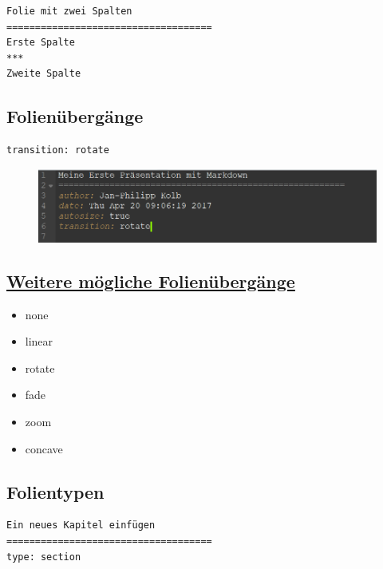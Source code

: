 \documentclass[]{article}
\providecommand{\tightlist}{%
  \setlength{\itemsep}{0pt}\setlength{\parskip}{0pt}}
\begin{document}
\begin{verbatim}
Folie mit zwei Spalten
====================================
Erste Spalte
***
Zweite Spalte
\end{verbatim}

\subsection{Folienübergänge}\label{folienubergange}

\begin{verbatim}
transition: rotate
\end{verbatim}

\begin{figure}
\centering
\includegraphics{figure/RpresRotate.PNG}
\caption{}
\end{figure}

\subsection{\texorpdfstring{\href{https://support.rstudio.com/hc/en-us/articles/200714013-Slide-Transitions-and-Navigation}{\textbf{Weitere
mögliche
Folienübergänge}}}{Weitere mögliche Folienübergänge}}\label{weitere-mogliche-folienubergange}

\begin{itemize}
\tightlist
\item
  none
\item
  linear
\item
  rotate
\item
  fade
\item
  zoom
\item
  concave
\end{itemize}

\subsection{Folientypen}\label{folientypen}

\begin{verbatim}
Ein neues Kapitel einfügen
====================================
type: section
\end{verbatim}
\end{document}
